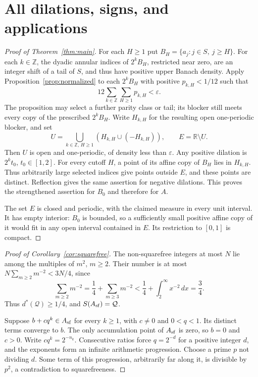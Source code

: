 \documentclass[11pt]{article}
\theoremstyle{remark}\newtheorem{remark}[theorem]{Remark}
\newcommand{\R}{\mathbb R}\newcommand{\N}{\mathbb N}
\newcommand{\Z}{\mathbb Z}\newcommand{\Prob}{\mathbb P}
\begin{document}
\section{All dilations, signs, and applications}
\begin{proof}[Proof of Theorem~\ref{thm:main}]
For each $H\ge1$ put $B_H=\{a_j:j\in S,\ j\ge H\}$. For each
$k\in\Z$, the dyadic annular indices of $2^kB_H$, restricted near zero,
are an integer shift of a tail of $S$, and thus have positive upper
Banach density. Apply Proposition~\ref{prop:normalized} to each
$2^kB_H$ with positive $p_{k,H}<1/12$ such that
\[
 12\sum_{k\in\Z}\sum_{H\ge1}p_{k,H}<\varepsilon.
\]
The proposition may select a further parity class or tail; its blocker
still meets every copy of the prescribed $2^kB_H$. Write $H_{k,H}$
for the resulting open one-periodic blocker, and set
\[
 U=\bigcup_{k\in\Z,\,H\ge1}(H_{k,H}\cup(-H_{k,H})),
 \qquad E=\R\setminus U.
\]
Then $U$ is open and one-periodic, of density less than $\varepsilon$.
Any positive dilation is $2^kt_0$, $t_0\in[1,2]$. For every cutoff $H$,
a point of its affine copy of $B_H$ lies in $H_{k,H}$. Thus arbitrarily
large selected indices give points outside $E$, and these points are
distinct. Reflection gives the same assertion for negative dilations.
This proves the strengthened assertion for $B_0$ and therefore for $A$.

The set $E$ is closed and periodic, with the claimed measure in every unit interval. It has empty interior: $B_0$ is bounded, so a sufficiently small positive affine copy of it would fit in any open interval contained in $E$. Its restriction to $[0,1]$ is compact.
\end{proof}

\begin{proof}[Proof of Corollary~\ref{cor:squarefree}]
The non-squarefree integers at most $N$ lie among the multiples of $m^2$, $m\ge2$. Their number is at most $N\sum_{m\ge2}m^{-2}<3N/4$, since
\[
 \sum_{m\ge2}m^{-2}=\frac14+\sum_{m\ge3}m^{-2}
 <\frac14+\int_2^\infty x^{-2}\,dx=\frac34.
\]
Thus $d^*(\mathcal Q)\ge1/4$, and $S(A_{\rm sf})=\mathcal Q$.

Suppose $b+cq^k\in A_{\rm sf}$ for every $k\ge1$, with $c\ne0$ and $0<q<1$. Its distinct terms converge to $b$. The only accumulation point of $A_{\rm sf}$ is zero, so $b=0$ and $c>0$. Write $cq^k=2^{-n_k}$. Consecutive ratios force $q=2^{-d}$ for a positive integer $d$, and the exponents form an infinite arithmetic progression. Choose a prime $p$ not dividing $d$. Some term of this progression, arbitrarily far along it, is divisible by $p^2$, a contradiction to squarefreeness.
\end{proof}
\end{document}
